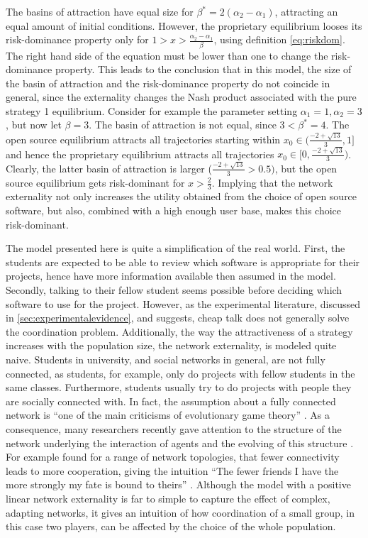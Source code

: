 The basins of attraction have equal size for $\beta^* = 2 (\alpha_2 -\alpha_1)$,
attracting an equal amount of initial conditions. However,
the proprietary equilibrium looses its risk-dominance property 
only for $1 > x > \frac{\alpha_2-\alpha_1}{\beta}  $, using definition 
\ref{eq:riskdom}. The right hand side of the equation must be lower than one 
to change the risk-dominance property. This leads to the conclusion 
that in this model, the size of the basin of attraction and the risk-dominance
property do not coincide in general, since the externality changes the Nash 
product associated with the pure strategy 1 equilibrium. Consider for example 
the parameter setting $\alpha_1 =1, \alpha_2=3$, but now let $\beta=3$. 
The basin of attraction is not equal, since $3<\beta^*= 4$. 
The open source equilibrium attracts all trajectories starting within 
$x_0 \in (\frac{-2+\sqrt{13}}{3},1]$ and hence the proprietary equilibrium attracts
all trajectories $x_0 \in [0,\frac{-2+\sqrt{13}}{3})$. Clearly, the latter basin of 
attraction is larger ($\frac{-2+\sqrt{13}}{3}>0.5)$, 
but the open source equilibrium gets risk-dominant for
$x>\frac 23$. Implying that the network externality not only increases the
utility obtained from the choice of open source software, but also,
combined with a high enough user base, makes this choice risk-dominant. 

The model presented here is quite a simplification of the real world. 
First, the students are expected to be able to review which software is 
appropriate for their projects, hence have more information available then 
assumed in the model. Secondly, talking to their fellow student seems
possible before deciding which software to use for the project. 
However, as the experimental literature, discussed in 
\ref{sec:experimentalevidence}, and \textcite{aumann_nash_1990} suggests, 
cheap talk does not generally solve the coordination problem. 
Additionally, the way the attractiveness of a strategy increases with
the population size, the network externality, is modeled quite naive.
Students in university, and social networks in general, are not fully
connected, as students, for example, only do projects with fellow students
in the same classes. Furthermore, students usually try to do projects
with people they are socially connected with. In fact, the assumption about
a fully connected network is ``one of the main criticisms of evolutionary game
theory'' \parencite{hanauske_evolutionare_2011}. 
As a consequence, many researchers recently gave attention to the 
structure of the network underlying the interaction of agents and the 
evolving of this structure \parencite[46]{szabo_evolutionary_2007}.
For example \textcite{ohtsuki_simple_2006} found for a range of 
network topologies, that fewer connectivity 
leads to more cooperation, giving the intuition 
``The fewer friends I have the more strongly my fate is bound to theirs'' 
\parencite[1]{ohtsuki_simple_2006}.
Although the model with a positive linear network externality is far to 
simple to capture the effect of complex, adapting networks, it gives an 
intuition of how coordination of a small group, in this case two players, 
can be affected by the choice of the whole population.
